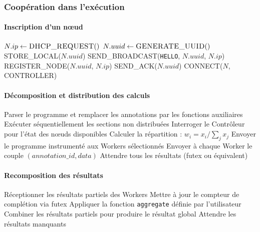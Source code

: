 \documentclass[12pt,a4paper]{report}
\begin{document}
\subsubsection{Coopération dans l'exécution}

\paragraph{Inscription d'un nœud}

\begin{algorithm}[H]
\caption{Entrée d'un nœud dans le réseau}
\label{alg:node_join}
\begin{algorithmic}[1]
\State $N.ip \gets \textsc{DHCP\_REQUEST}()$
\State $N.uuid \gets \textsc{GENERATE\_UUID}()$
\State \textsc{STORE\_LOCAL}($N.uuid$)
\State \textsc{SEND\_BROADCAST}(\texttt{HELLO}, $N.uuid$, $N.ip$)
    \State \textsc{REGISTER\_NODE}($N.uuid$, $N.ip$)
    \State \textsc{SEND\_ACK}($N.uuid$)
\EndIf
\State \textsc{CONNECT}($N$, \textsc{CONTROLLER})
\end{algorithmic}
\end{algorithm}

\paragraph{Décomposition et distribution des calculs}

\begin{algorithm}[H]
\caption{Processus de décomposition}
\label{alg:decomposition}
\begin{algorithmic}[1]
\State Parser le programme et remplacer les annotations par les fonctions auxiliaires
\State Exécuter séquentiellement les sections non distribuées
    \State Interroger le Contrôleur pour l'état des nœuds disponibles
    \State Calculer la répartition : $w_i = x_i / \sum_{j} x_j$
    \State Envoyer le programme instrumenté aux Workers sélectionnés
    \State Envoyer à chaque Worker le couple $(annotation\_id, data)$
\EndFor
\State Attendre tous les résultats (futex ou équivalent)
\end{algorithmic}
\end{algorithm}

\paragraph{Recomposition des résultats}

\begin{algorithm}[H]
\caption{Processus de recomposition}
\label{alg:recomposition}
\begin{algorithmic}[1]
\State Réceptionner les résultats partiels des Workers
\State Mettre à jour le compteur de complétion via futex
    \State Appliquer la fonction \texttt{aggregate} définie par l'utilisateur
    \State Combiner les résultats partiels pour produire le résultat global
\Else
    \State Attendre les résultats manquants
\EndIf
\end{algorithmic}
\end{algorithm}
\end{document}
